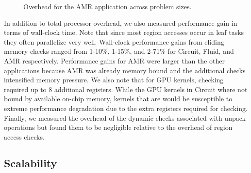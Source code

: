 \begin{figure}
\begin{center}
{\label{fig:amr8192}
}
\end{center}
\caption{Overhead for the AMR application across problem sizes.\label{fig:amr_overhead}}
\end{figure}

In addition to total processor overhead, we also measured performance gain in terms of wall-clock
time.  Note that since most region accesses occur in leaf tasks they often parallelize
very well.  Wall-clock performance gains from eliding memory checks ranged from 1-10\%, 1-15\%, 
and 2-71\% for Circuit, Fluid, and AMR respectively.  Performance gains for AMR were larger than
the other applications because AMR was already memory bound and the additional checks intensified
memory pressure.  We also note that for GPU kernels, checking required up to 8 additional registers.  
While the GPU kernels in Circuit where not bound by 
available on-chip memory, kernels that are would be susceptible to extreme performance 
degradation due to the extra registers required for checking.  Finally, we measured the overhead
of the dynamic checks associated with unpack operations but found them to be negligible relative
to the overhead of region access checks.

\subsection{Scalability}
\label{subsec:scalability}

